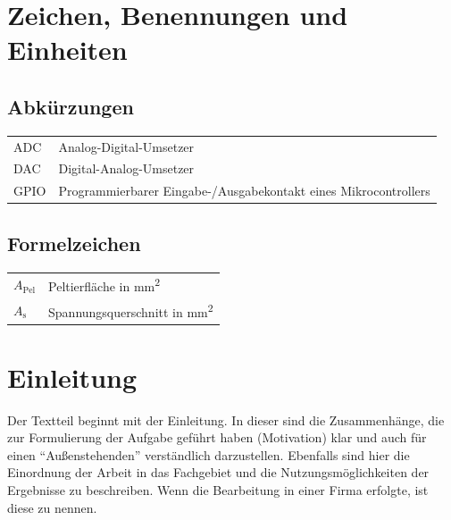 \documentclass[%
  paper=a4,
  fontsize=12pt,
  twoside=false,
  headsepline=true,
  numbers=noenddot]{scrartcl}
\begin{document}
\listoftables


\section*{Zeichen, Benennungen und Einheiten}

\subsection*{Abkürzungen}

\begin{tabular}{ll}
ADC&			Analog-Digital-Umsetzer\\
DAC&			Digital-Analog-Umsetzer\\
GPIO&			Programmierbarer Eingabe-/Ausgabekontakt eines Mikrocontrollers\\
\end{tabular}

\subsection*{Formelzeichen}

\begin{tabular}{ll}
  $A_\text{Pel}$ & Peltierfläche in \unit{\milli\metre\squared}\\
  $A_\text{s}$ & Spannungsquerschnitt in \unit{\milli\metre\squared}\\
\end{tabular}

\cleardoublepage
{}


\section{Einleitung}

Der Textteil beginnt mit der Einleitung. In dieser  sind die Zusammenhänge, die zur
Formulierung der Aufgabe geführt haben (Motivation) klar und auch für einen "`Außenstehenden"' verständlich darzustellen. Ebenfalls sind hier die Einordnung der Arbeit in das
Fachgebiet und die Nutzungsmöglichkeiten der Ergebnisse zu beschreiben. Wenn die
Bearbeitung in einer Firma erfolgte, ist diese zu nennen.
\end{document}
